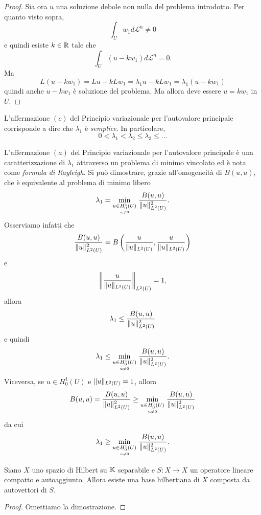 \begin{proof}
	Sia ora $u$ una soluzione debole non nulla del problema introdotto. Per quanto visto sopra, 
	\[ \int_U w_1 d\mathcal{L}^n \ne 0 \]
	e quindi esiste $k \in \R$ tale che 
	\[ \int_U \left( u-kw_1\right) d\mathcal{L}^n = 0. \]
	Ma 
	\[ L\left( u-kw_1\right)  = Lu -kLw_1 = \lambda_1 u - k Lw_1 = \lambda_1 \left( u-kw_1\right)  \]
	quindi anche $u-kw_1$ è soluzione del problema. Ma allora deve essere $u = kw_1$ in $U$.
\end{proof}
\begin{osservazione}
	L'affermazione $(c)$ del Principio variazionale per l'autovalore principale corrisponde a dire che $\lambda_1$ è \emph{semplice}. In particolare,
	\[ 0<\lambda_1 < \lambda_2 \le \lambda_3 \le \dots \]
\end{osservazione}
\begin{osservazione}
	L'affermazione $(a)$ del Principio variazionale per l'autovalore principale è una caratterizzazione di $\lambda_1$ attraverso un problema di minimo vincolato ed è nota come \emph{formula di Rayleigh}. Si può dimostrare, grazie all'omogeneità di $B(u,u)$, che è equivalente al problema di minimo libero
	\[ \lambda_1 = \underset{\underset{u \ne 0}{u \in H^1_0(U)}}{\min}\; \frac{B(u,u)}{\norm{u}_{L^2(U)}^2}. \] 
	Osserviamo infatti che 
	\[ \frac{B(u,u)}{\norm{u}_{L^2(U)}^2} = B\left( \frac{u}{\norm{u}_{L^2(U)}},\frac{u}{\norm{u}_{L^2(U)}}\right) \]
	e  
	\[ \norm*{\frac{u}{\norm{u}_{L^2(U)}}}_{L^2(U)}=1, \]
	allora
	\[ \lambda_1 \le \frac{B(u,u)}{\norm{u}_{L^2(U)}^2} \]
	e quindi 
	\[ \lambda_1 \le \underset{\underset{u \ne 0}{u \in H^1_0(U)}}{\min}\; \frac{B(u,u)}{\norm{u}_{L^2(U)}^2}. \]
	Viceversa, se $u \in H^1_0(U)$ e $\norm{u}_{L^2(U)} = 1$, allora
	\[ B(u,u) = \frac{B(u,u)}{\norm{u}^2_{L^2(U)}} \ge \underset{\underset{u \ne 0}{u \in H^1_0(U)}}{\min}\; \frac{B(u,u)}{\norm{u}_{L^2(U)}^2} \]
	da cui 
	\[ \lambda_1 \ge \underset{\underset{u \ne 0}{u \in H^1_0(U)}}{\min}\; \frac{B(u,u)}{\norm{u}_{L^2(U)}^2}.\]
\end{osservazione}

\begin{teorema}
	Siano $X$ uno spazio di Hilbert su $\K$ separabile e $S: X \to X$ un operatore lineare compatto e autoaggiunto. Allora esiste una base hilbertiana di $X$ composta da autovettori di $S$.
\end{teorema}
\begin{proof}
	Omettiamo la dimostrazione.
\end{proof}


